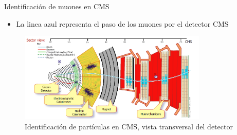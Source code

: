 \begin{frame}{Identificaci\'on de muones en CMS}

\begin{itemize}
    \item La linea azul representa el paso de los muones por el detector CMS
\end{itemize}

\begin{figure}
    \centering
    \includegraphics[width=0.8\textwidth]{Imag/reconstruccion_muones.png}
    \caption{Identificaci\'on de part\'iculas en CMS, vista transversal del detector}
    \label{fig:my_label}
\end{figure}
    
\end{frame}



